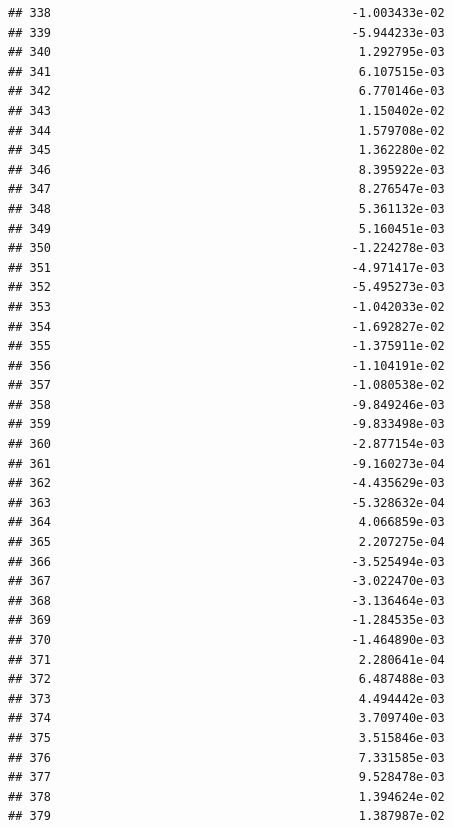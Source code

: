 \documentclass[
]{article}
\begin{document}
\begin{verbatim}
## 338                                          -1.003433e-02
## 339                                          -5.944233e-03
## 340                                           1.292795e-03
## 341                                           6.107515e-03
## 342                                           6.770146e-03
## 343                                           1.150402e-02
## 344                                           1.579708e-02
## 345                                           1.362280e-02
## 346                                           8.395922e-03
## 347                                           8.276547e-03
## 348                                           5.361132e-03
## 349                                           5.160451e-03
## 350                                          -1.224278e-03
## 351                                          -4.971417e-03
## 352                                          -5.495273e-03
## 353                                          -1.042033e-02
## 354                                          -1.692827e-02
## 355                                          -1.375911e-02
## 356                                          -1.104191e-02
## 357                                          -1.080538e-02
## 358                                          -9.849246e-03
## 359                                          -9.833498e-03
## 360                                          -2.877154e-03
## 361                                          -9.160273e-04
## 362                                          -4.435629e-03
## 363                                          -5.328632e-04
## 364                                           4.066859e-03
## 365                                           2.207275e-04
## 366                                          -3.525494e-03
## 367                                          -3.022470e-03
## 368                                          -3.136464e-03
## 369                                          -1.284535e-03
## 370                                          -1.464890e-03
## 371                                           2.280641e-04
## 372                                           6.487488e-03
## 373                                           4.494442e-03
## 374                                           3.709740e-03
## 375                                           3.515846e-03
## 376                                           7.331585e-03
## 377                                           9.528478e-03
## 378                                           1.394624e-02
## 379                                           1.387987e-02

\end{verbatim}
\end{document}
